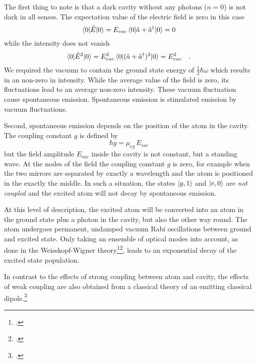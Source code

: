 The first thing to note is that a dark cavity without any photons ($n=0$) is not dark in all senses. The expectation value of the electric field is zero in this case
\begin{equation}
 \braket{ 0 | \hat{E} | 0} = 
    E_{vac} \braket{0 | \hat{a}  + \hat{a}^\dagger    | 0  } 
       = 0
\end{equation}
while the intensity does not vanish
\begin{equation}
 \braket{ 0 | \hat{E}^2 | 0} = E_{vac}^2
    \braket{0 | (\hat{a}  + \hat{a}^\dagger )^2   | 0  }  
    =    E_{vac}^2 \quad .
\end{equation}
We required the vacuum to contain the ground state energy of $\frac{1}{2} \hbar \omega$ which results in an non-zero in intensity. While the average value of the field is zero, its fluctuations lead to an average non-zero intensity. These vacuum fluctuation cause spontaneous emission. Spontaneous emission is stimulated emission by vacuum fluctuations.

Second, spontaneous emission depends on the position of the atom in the cavity. The coupling constant $g$ is defined by
\begin{equation}
\hbar  g = \mu_{eg} \, E_{vac} 
\end{equation}
but the field amplitude $ E_{vac} $ inside the cavity is not constant, but a standing wave. At the nodes of the field the coupling constant $g$ is zero, for example when the two mirrors are separated by exactly a wavelength and the atom is positioned in the exactly the middle. In such a situation, the states $\ket{g, 1}$ and $\ket{e, 0}$ are \emph{not coupled} and the excited atom will not decay by spontaneous emission.

At this level of description, the excited atom will be converted into an atom in the ground state plus a photon in the cavity, but also the other way round. The atom undergoes permanent, undamped vacuum Rabi oscillations between ground and excited state. Only taking an ensemble of optical modes into account, as done in the Weisskopf-Wigner theory\footcite[chapter 8.4]{Novotny-Hecht2012}\footcite[chapter 14.3]{MeystreSargent2007}, leads to an exponential decay of the excited state population.

In contrast to the effects of strong coupling between atom and cavity, the effects of weak coupling are also obtained from a classical theory of an emitting classical dipole.\footcite[chapter 4.10]{Loudon}




